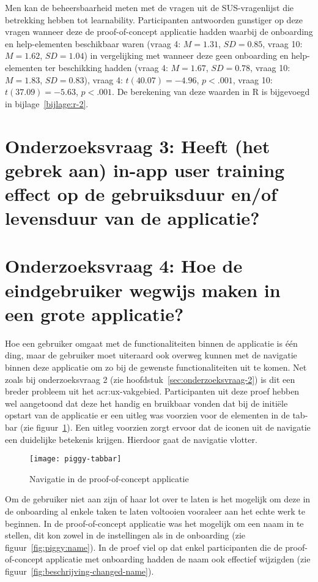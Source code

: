 Men kan de beheersbaarheid meten met de vragen uit de SUS-vragenlijst die betrekking hebben tot learnability. Participanten antwoorden gunstiger op deze vragen wanneer deze de proof-of-concept applicatie hadden waarbij de onboarding en help-elementen beschikbaar waren (vraag 4: $M = 1.31$, $SD = 0.85$, vraag 10: $M = 1.62$, $SD = 1.04$) in vergelijking met wanneer deze geen onboarding en help-elementen ter beschikking hadden (vraag 4: $M = 1.67$, $SD = 0.78$, vraag 10: $M = 1.83$, $SD = 0.83$), vraag 4: $t(40.07) = -4.96$, $p < .001$, vraag 10: $t(37.09) = -5.63$, $p < .001$. De berekening van deze waarden in R is bijgevoegd in bijlage~\ref{bijlage:r-2}.

\section[Onderzoeksvraag 3]{Onderzoeksvraag 3: Heeft (het gebrek aan) in-app user training effect op de gebruiksduur en/of levensduur van de applicatie?}
\label{sec:onderzoeksvraag-3}

\section[Onderzoeksvraag 4]{Onderzoeksvraag 4: Hoe de eindgebruiker wegwijs maken in een grote applicatie?}
\label{sec:onderzoeksvraag-4}

Hoe een gebruiker omgaat met de functionaliteiten binnen de applicatie is één ding, maar de gebruiker moet uiteraard ook overweg kunnen met de navigatie binnen deze applicatie om zo bij de gewenste functionaliteiten uit te komen. Net zoals bij onderzoeksvraag 2 (zie hoofdstuk~\ref{sec:onderzoeksvraag-2}) is dit een breder probleem uit het \acrshort{acr:ux}-vakgebied. Participanten uit deze proef hebben wel aangetoond dat deze het handig en bruikbaar vonden dat bij de initiële opstart van de applicatie er een uitleg was voorzien voor de elementen in de tab-bar (zie figuur~\ref{fig:piggy:tabbar}). Een uitleg voorzien zorgt ervoor dat de iconen uit de navigatie een duidelijke betekenis krijgen. Hierdoor gaat de navigatie vlotter.

\begin{figure}[h!]
    \centering
    \texttt{[image: piggy-tabbar]}
    \caption{Navigatie in de proof-of-concept applicatie}
    \label{fig:piggy:tabbar}
\end{figure}

Om de gebruiker niet aan zijn of haar lot over te laten is het mogelijk om deze in de onboarding al enkele taken te laten voltooien vooraleer aan het echte werk te beginnen. In de proof-of-concept applicatie was het mogelijk om een naam in te stellen, dit kon zowel in de instellingen als in de onboarding (zie figuur~\ref{fig:piggy:name}). In de proef viel op dat enkel participanten die de proof-of-concept applicatie met onboarding hadden de naam ook effectief wijzigden (zie figuur~\ref{fig:beschrijving-changed-name}).

